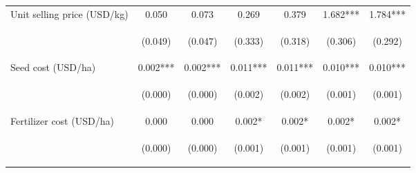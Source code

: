 \begin{center}
\begin{tabular}{lcccccc}
Unit selling price (USD/kg) & 0.050 & 0.073 & 0.269 & 0.379 & 1.682*** & 1.784*** \\
\vspace{4pt} & \begin{footnotesize}(0.049)\end{footnotesize} & \begin{footnotesize}(0.047)\end{footnotesize} & \begin{footnotesize}(0.333)\end{footnotesize} & \begin{footnotesize}(0.318)\end{footnotesize} & \begin{footnotesize}(0.306)\end{footnotesize} & \begin{footnotesize}(0.292)\end{footnotesize} \\
Seed cost (USD/ha) & 0.002*** & 0.002*** & 0.011*** & 0.011*** & 0.010*** & 0.010*** \\
\vspace{4pt} & \begin{footnotesize}(0.000)\end{footnotesize} & \begin{footnotesize}(0.000)\end{footnotesize} & \begin{footnotesize}(0.002)\end{footnotesize} & \begin{footnotesize}(0.002)\end{footnotesize} & \begin{footnotesize}(0.001)\end{footnotesize} & \begin{footnotesize}(0.001)\end{footnotesize} \\
Fertilizer cost (USD/ha) & 0.000 & 0.000 & 0.002* & 0.002* & 0.002* & 0.002* \\
\vspace{4pt} & \begin{footnotesize}(0.000)\end{footnotesize} & \begin{footnotesize}(0.000)\end{footnotesize} & \begin{footnotesize}(0.001)\end{footnotesize} & \begin{footnotesize}(0.001)\end{footnotesize} & \begin{footnotesize}(0.001)\end{footnotesize} & \begin{footnotesize}(0.001)\end{footnotesize} \\

\end{tabular}
\end{center}
